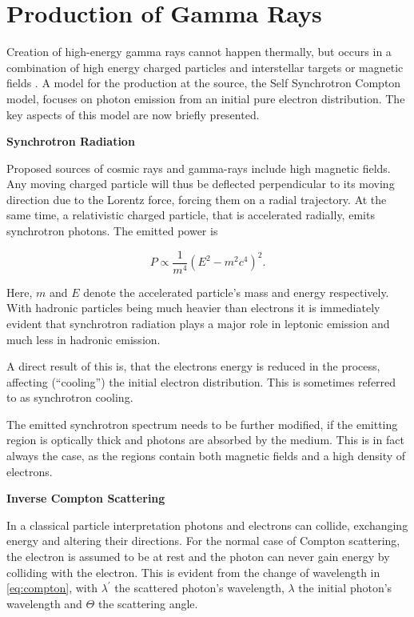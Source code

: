 \section{Production of Gamma Rays}
Creation of high-energy gamma rays cannot happen thermally,
but occurs in a combination of high energy charged particles 
and interstellar targets or magnetic fields \cite{funcray}.
A model for the production at the source, the Self Synchrotron Compton model,
focuses on photon emission from an initial pure electron distribution.
The key aspects of this model are now briefly presented. 

\newpage
\textbf{Synchrotron Radiation}

Proposed sources of cosmic rays and gamma-rays include 
high magnetic fields. Any moving charged particle will thus be
deflected perpendicular to its moving direction
due to the Lorentz force, forcing them on a radial trajectory.
At the same time, a relativistic charged particle, 
that is accelerated radially, emits synchrotron 
photons. The emitted power is

\begin{equation}
	P \propto \frac{1}{m^4} \left(E^2 - m^2c^4\right)^2.
	\label{eq:synchrotron}
\end{equation}

Here, $m$ and $E$ denote the accelerated particle's 
mass and energy respectively. %
With hadronic particles being much heavier than electrons
it is immediately evident that
synchrotron radiation plays a major role in leptonic 
emission and much less in hadronic emission.

A direct result of this is, that the electrons energy is reduced
in the process, affecting (\enquote{cooling}) the initial electron distribution.
This is sometimes referred to as synchrotron cooling.

The emitted synchrotron spectrum needs to be further modified,
if the emitting region is optically thick and photons 
are absorbed by the medium.
This is in fact always the case, as the regions contain
both magnetic fields and a high density of electrons.

\textbf{Inverse Compton Scattering}

In a classical particle interpretation photons and electrons 
can collide, exchanging energy and altering their directions.
For the normal case of Compton scattering, the electron 
is assumed to be at rest and the photon can never gain 
energy by colliding with the electron.
This is evident from the change of wavelength in \eqref{eq:compton},
with $\lambda^{\prime}$ the scattered photon's 
wavelength, $\lambda$ the initial photon's wavelength  
and $\Theta$ the scattering angle.

